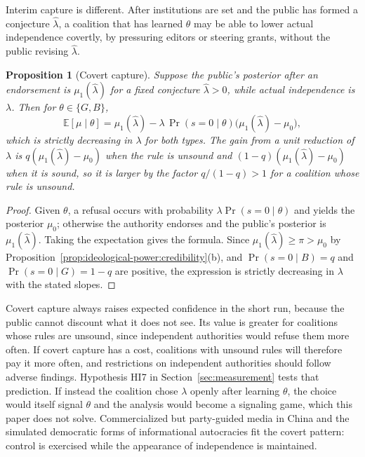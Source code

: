\documentclass[11pt,letterpaper]{article}
\newtheorem{proposition}[theorem]{Proposition}
\theoremstyle{definition}
\theoremstyle{remark}
\newcommand{\E}{\mathbb{E}}
\newcommand{\Prob}{\Pr}
\begin{document}
Interim capture is different. After institutions are set and the public has formed a conjecture $\hat\lambda$, a coalition that has learned $\theta$ may be able to lower actual independence covertly, by pressuring editors or steering grants, without the public revising $\hat\lambda$.

\begin{proposition}[Covert capture]
\label{prop:ideological-power:covert}
Suppose the public's posterior after an endorsement is $\mu_1(\hat\lambda)$ for a fixed conjecture $\hat\lambda>0$, while actual independence is $\lambda$. Then for $\theta\in\{G,B\}$,
\[
\E[\mu\mid\theta]=\mu_1(\hat\lambda)-\lambda\,\Prob(s=0\mid\theta)\bigl(\mu_1(\hat\lambda)-\mu_0\bigr),
\]
which is strictly decreasing in $\lambda$ for both types. The gain from a unit reduction of $\lambda$ is $q(\mu_1(\hat\lambda)-\mu_0)$ when the rule is unsound and $(1-q)(\mu_1(\hat\lambda)-\mu_0)$ when it is sound, so it is larger by the factor $q/(1-q)>1$ for a coalition whose rule is unsound.
\end{proposition}

\begin{proof}
Given $\theta$, a refusal occurs with probability $\lambda\Prob(s=0\mid\theta)$ and yields the posterior $\mu_0$; otherwise the authority endorses and the public's posterior is $\mu_1(\hat\lambda)$. Taking the expectation gives the formula. Since $\mu_1(\hat\lambda)\geq\pi>\mu_0$ by Proposition~\ref{prop:ideological-power:credibility}(b), and $\Prob(s=0\mid B)=q$ and $\Prob(s=0\mid G)=1-q$ are positive, the expression is strictly decreasing in $\lambda$ with the stated slopes.
\end{proof}

Covert capture always raises expected confidence in the short run, because the public cannot discount what it does not see. Its value is greater for coalitions whose rules are unsound, since independent authorities would refuse them more often. If covert capture has a cost, coalitions with unsound rules will therefore pay it more often, and restrictions on independent authorities should follow adverse findings. Hypothesis HI7 in Section~\ref{sec:measurement} tests that prediction. If instead the coalition chose $\lambda$ openly after learning $\theta$, the choice would itself signal $\theta$ and the analysis would become a signaling game, which this paper does not solve. Commercialized but party-guided media in China \citep{stockmann2013} and the simulated democratic forms of informational autocracies \citep{guriev2019} fit the covert pattern: control is exercised while the appearance of independence is maintained.
\end{document}
